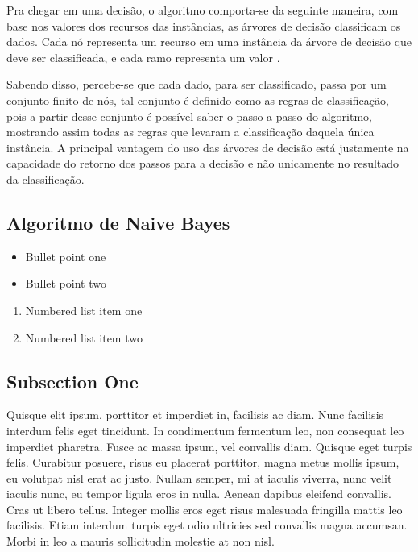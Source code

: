 \documentclass[preprint,12pt,times]{elsarticle}
\begin{document}
	Pra chegar em uma decisão, o algoritmo comporta-se da seguinte maneira, com base nos valores dos recursos das instâncias, as árvores de decisão classificam os dados. Cada nó representa um recurso em uma instância da árvore de decisão que deve ser classificada, e cada ramo representa um valor \cite{Pandya:2015}.
	
	Sabendo disso, percebe-se que cada dado, para ser classificado, passa por um conjunto finito de nós, tal conjunto é definido como as regras de classificação, pois a partir desse conjunto é possível saber o passo a passo do algoritmo, mostrando assim todas as regras que levaram a classificação daquela única instância. A principal vantagem do uso das árvores de decisão está justamente na capacidade do retorno dos passos para a decisão e não unicamente no resultado da classificação.
	
	\subsection{Algoritmo de Naive Bayes}
	
	\begin{itemize}
		\item Bullet point one
		\item Bullet point two
	\end{itemize}
	
	\begin{enumerate}
		\item Numbered list item one
		\item Numbered list item two
	\end{enumerate}
	
	\subsection{Subsection One}
	
	Quisque elit ipsum, porttitor et imperdiet in, facilisis ac diam. Nunc facilisis interdum felis eget tincidunt. In condimentum fermentum leo, non consequat leo imperdiet pharetra. Fusce ac massa ipsum, vel convallis diam. Quisque eget turpis felis. Curabitur posuere, risus eu placerat porttitor, magna metus mollis ipsum, eu volutpat nisl erat ac justo. Nullam semper, mi at iaculis viverra, nunc velit iaculis nunc, eu tempor ligula eros in nulla. Aenean dapibus eleifend convallis. Cras ut libero tellus. Integer mollis eros eget risus malesuada fringilla mattis leo facilisis. Etiam interdum turpis eget odio ultricies sed convallis magna accumsan. Morbi in leo a mauris sollicitudin molestie at non nisl.
	
\end{document}
